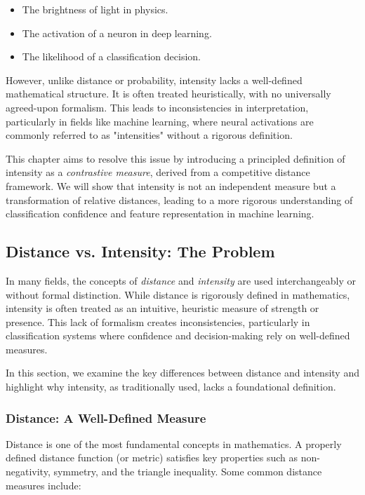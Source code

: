 \documentclass[12pt]{article}
\begin{document}
\begin{itemize}
    \item The brightness of light in physics.
    \item The activation of a neuron in deep learning.
    \item The likelihood of a classification decision.
\end{itemize}

However, unlike distance or probability, intensity lacks a well-defined mathematical structure. It is often treated heuristically, with no universally agreed-upon formalism. This leads to inconsistencies in interpretation, particularly in fields like machine learning, where neural activations are commonly referred to as "intensities" without a rigorous definition.

This chapter aims to resolve this issue by introducing a principled definition of intensity as a \textit{contrastive measure}, derived from a competitive distance framework. We will show that intensity is not an independent measure but a transformation of relative distances, leading to a more rigorous understanding of classification confidence and feature representation in machine learning.


\subsection{Distance vs. Intensity: The Problem}

In many fields, the concepts of \textit{distance} and \textit{intensity} are used interchangeably or without formal distinction. While distance is rigorously defined in mathematics, intensity is often treated as an intuitive, heuristic measure of strength or presence. This lack of formalism creates inconsistencies, particularly in classification systems where confidence and decision-making rely on well-defined measures.

In this section, we examine the key differences between distance and intensity and highlight why intensity, as traditionally used, lacks a foundational definition.

\subsubsection{Distance: A Well-Defined Measure}

Distance is one of the most fundamental concepts in mathematics. A properly defined distance function (or metric) satisfies key properties such as non-negativity, symmetry, and the triangle inequality. Some common distance measures include:
\end{document}
